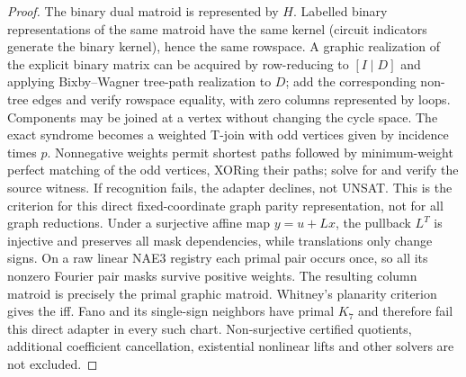 \documentclass[11pt]{article}
\begin{document}
\begin{proof}
The binary dual matroid is represented by $H$. Labelled binary representations of the same matroid have the same kernel (circuit indicators generate the binary kernel), hence the same rowspace. A graphic realization of the explicit binary matrix can be acquired by row-reducing to $[I\mid D]$ and applying Bixby--Wagner tree-path realization to $D$; add the corresponding non-tree edges and verify rowspace equality, with zero columns represented by loops. Components may be joined at a vertex without changing the cycle space. The exact syndrome becomes a weighted T-join with odd vertices given by incidence times $p$. Nonnegative weights permit shortest paths followed by minimum-weight perfect matching of the odd vertices, XORing their paths; solve for and verify the source witness. If recognition fails, the adapter declines, not UNSAT. This is the criterion for this direct fixed-coordinate graph parity representation, not for all graph reductions. Under a surjective affine map $y=u+Lx$, the pullback $L^T$ is injective and preserves all mask dependencies, while translations only change signs. On a raw linear NAE3 registry each primal pair occurs once, so all its nonzero Fourier pair masks survive positive weights. The resulting column matroid is precisely the primal graphic matroid. Whitney's planarity criterion gives the iff. Fano and its single-sign neighbors have primal $K_7$ and therefore fail this direct adapter in every such chart. Non-surjective certified quotients, additional coefficient cancellation, existential nonlinear lifts and other solvers are not excluded.
\end{proof}
\end{document}
